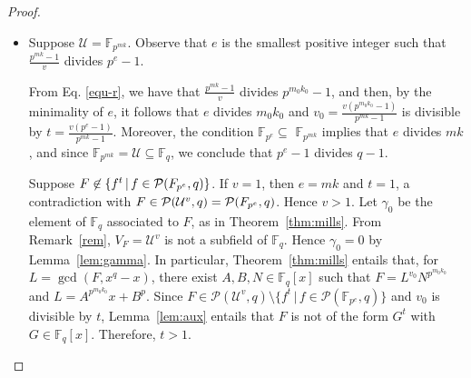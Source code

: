 \documentclass[11pt]{amsart}
\newcommand{\F}{\mathbb{F}}
\newcommand{\pp}{\mathcal P}
\theoremstyle{definition}
\theoremstyle{remark}
\begin{document}
\begin{proof}
\begin{itemize}
Since  $v\ge 2$,  the proof of assertion (i)  will be finished once we prove that $p^{mk-n/2}<1$, that is, $mk< \frac{n}{2}$.  Given that  $0\in V_F$ is an element with the smallest nontrivial pre-image by $F$ over $\F_q$, we obtain $\deg(L)=\#(F^{-1}(0)\cap \F_q) \le \frac{p^n}{\# V_F}=\frac{p^n}{r+1}$, and then  Eq. \eqref{rad1} gives 
\begin{equation}\label{eq:N0}
\deg(N)\ge\frac{r-1}{r+1}p^{n/2}+1.
\end{equation}
In addition, since $m>1$, $v$ divides $p^k-1$, and $r=\frac{p^{mk-1}}{v}$,  we have  
$$r\ge \frac{p^{mk}-1}{p^k-1}>p^{(m-1)k}\ge 2.$$
Hence $r\ge 3$ , $\deg(N)\ge\frac{1}{2}p^{n/2}+1$, and then  
$$\deg(F)>p^{mk}\cdot \deg(N)\ge \frac{1}{2}p^{n/2+mk}.$$
Therefore, if $mk\ge \frac{n}{2}$, then  $\deg(F)\ge \frac{q}{2}$ , which contradicts $3\le \# V_F<\frac{q}{\deg(F)}+1$.  





\item Suppose  $\mathcal U=\F_{p^{mk}}$. Observe that $e$ is the smallest positive integer such that $\frac{p^{mk}-1}{v}$ divides $p^e-1$. 

From Eq. \eqref{equ-r},  we have  that 
 $\frac{p^{mk}-1}{v}$ divides $p^{m_0k_0}-1$, and then, by the minimality of $e$, it follows that $e$ divides $m_0k_0$ and  $v_0=\frac{v(p^{m_0k_0}-1)}{p^{mk}-1}$ is divisible by $t=\frac{v\left(p^e-1\right)}{p^{m k}-1}$. Moreover, the condition $\mathbb{F}_{p^e} \subseteq$ $\mathbb{F}_{p^{m k}}$ implies that $e$ divides $mk$, and  since $\F_{p^{mk}}=\mathcal U\subseteq \F_q$, we conclude that $p^e-1$ divides $q-1$.

Suppose $F\not\in\{f^t\,|\, f\in \pp(\mathcal \F_{p^e}, q)\}$. If $v=1$, then $e=mk$ and $t=1$, a contradiction with $F\in \pp(\mathcal U^v, q)=\pp(\mathcal \F_{p^e}, q)$. Hence $v>1$. 
Let $\gamma_0$ be the element of $\F_q$ associated to $F$, as in Theorem~\ref{thm:mills}. From Remark~\ref{rem}, $V_F=\mathcal U^v$ is not a subfield of $\F_q$. Hence $\gamma_0=0$ by Lemma~\ref{lem:gamma}. In particular, Theorem~\ref{thm:mills} entails that, for $L=\gcd(F,x^q-x)$, there exist $A, B, N\in \F_q[x]$ such that $F=L^{v_0}N^{p^{m_0k_0}}$ and $L=A^{p^{m_0k_0}}x+B^p$. Since $F\in \pp(\mathcal U^v, q)\setminus \{ f^{t}\,|\, f\in \pp(\F_{p^e}, q)\}$ and $v_0$ is divisible by $t$, Lemma~\ref{lem:aux} entails that $F$ is not of the form $G^t$ with $G\in \F_q[x]$. Therefore, $t>1$.


\end{itemize}
\end{proof}
\end{document}
